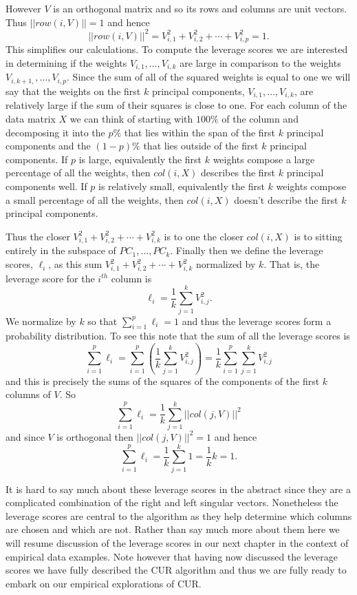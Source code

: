 \documentclass{book}
\begin{document}
However $V$ is an orthogonal matrix and so its rows and columns are unit vectors. Thus $||row(i,V)||=1$ and hence
$$
||row(i,V)||^2=V_{i,1}^2+V_{i,2}^2+\cdots+V_{i,p}^2=1.
$$
This simplifies our calculations. To compute the leverage scores we are interested in determining if the weights $V_{i,1},\ldots,V_{i,k}$ are large in comparison to the weights $V_{i,k+1,},\ldots,V_{i,p}$.  Since the sum of all of the squared weights is equal to one we will say that the weights on the first $k$ principal components, $V_{i,1},\ldots,V_{i,k}$, are relatively large if the sum of their squares is close to one. For each column of the data matrix $X$ we can think of starting with $100\%$ of the column and decomposing it into the $p\%$ that lies within the span of the first $k$ principal components and the $(1-p)\%$ that lies outside of the first $k$ principal components. If $p$ is large, equivalently the first $k$ weights compose a large percentage of all the weights, then $col(i,X)$ describes the first $k$ principal components well. If $p$ is relatively small, equivalently the first $k$ weights compose a small percentage of all the weights, then $col(i,X)$ doesn't describe the first $k$ principal components.

Thus the closer $V_{i,1}^2+V_{i,2}^2+\cdots+V_{i,k}^2$ is to one the closer $col(i,X)$ is to sitting entirely in the subspace of $PC_1,\ldots,PC_k$. Finally then we define the leverage scores, $\ell_i$, as this sum $V_{i,1}^2+V_{i,2}^2+\cdots+V_{i,k}^2$ normalized by $k$. That is, the leverage score for the $i^{th}$ column is
$$
\ell_i=\frac{1}{k}\sum_{j=1}^{k}V_{i,j}^2.
$$
We normalize by $k$ so that $\sum_{i=1}^{p}\ell_i=1$ and thus the leverage scores form a probability distribution. To see this note that the sum of all the leverage scores is 
$$
\sum_{i=1}^{p}\ell_i=\sum_{i=1}^{p}\left(\frac{1}{k}\sum_{j=1}^{k}V_{i,j}^2\right)=\frac{1}{k}\sum_{i=1}^{p}\sum_{j=1}^{k}V_{i,j}^2
$$
and this is precisely the sums of the squares of the components of the first $k$ columns of $V$. So 
$$
\sum_{i=1}^{p}\ell_i=\frac{1}{k}\sum_{j=1}^{k}||col(j,V)||^2
$$
and since $V$ is orthogonal then $||col(j,V)||^2=1$ and hence
$$
\sum_{i=1}^{p}\ell_i=\frac{1}{k}\sum_{j=1}^{k}1=\frac{1}{k}k=1.
$$

It is hard to say much about these leverage scores in the abstract since they are a complicated combination of the right and left singular vectors. Nonetheless the leverage scores are central to the algorithm as they help determine which columns are chosen and which are not. Rather than say much more about them here we will resume discussion of the leverage scores in our next chapter in the context of empirical data examples. Note however that having now discussed the leverage scores we have fully described the CUR algorithm and thus we are fully ready to embark on our empirical explorations of CUR.
\end{document}
